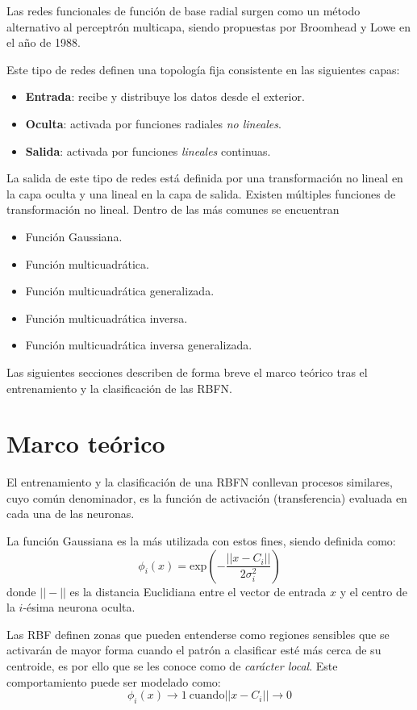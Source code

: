 \documentclass[journal]{IEEEtran}
\begin{document}
Las redes funcionales de función de base radial surgen como un método alternativo al perceptrón multicapa, siendo propuestas por Broomhead y Lowe en el año de 1988.

Este tipo de redes definen una topología fija consistente en las siguientes capas:
\begin{itemize}
	\item \textbf{Entrada}: recibe y distribuye los datos desde el exterior.
	\item \textbf{Oculta}: activada por funciones radiales \emph{no lineales}.
	\item \textbf{Salida}: activada por funciones \emph{lineales} continuas.
\end{itemize}

La salida de este tipo de redes está definida por una transformación no lineal en la capa oculta y una lineal en la capa de salida.
Existen múltiples funciones de transformación no lineal.
Dentro de las más comunes se encuentran
\begin{itemize}
	\item Función Gaussiana.
	\item Función multicuadrática.
	\item Función multicuadrática generalizada.
	\item Función multicuadrática inversa.
	\item Función multicuadrática inversa generalizada.
\end{itemize}

Las siguientes secciones describen de forma breve el marco teórico tras el entrenamiento y la clasificación de las RBFN.

\section{Marco teórico}
\label{sec:marco_teorico}
El entrenamiento y la clasificación de una RBFN conllevan procesos similares, cuyo común denominador, es la función de activación (transferencia) evaluada en cada una de las neuronas.

La función Gaussiana es la más utilizada con estos fines, siendo definida como:
$$
\phi_i (x) = \text{exp}(-\frac{||x-C_i||}{2\sigma_i^2})
$$
donde $||-||$ es la distancia Euclidiana entre el vector de entrada $x$ y el centro de la $i$-ésima neurona oculta.

Las RBF definen zonas que pueden entenderse como regiones sensibles que se activarán de mayor forma cuando el patrón a clasificar esté más cerca de su centroide, es por ello que se les conoce como de \emph{carácter local}.
Este comportamiento puede ser modelado como:
$$
\phi _i (x) \rightarrow 1 ~\text{cuando} ||x-C_i||\rightarrow 0
$$
\end{document}
